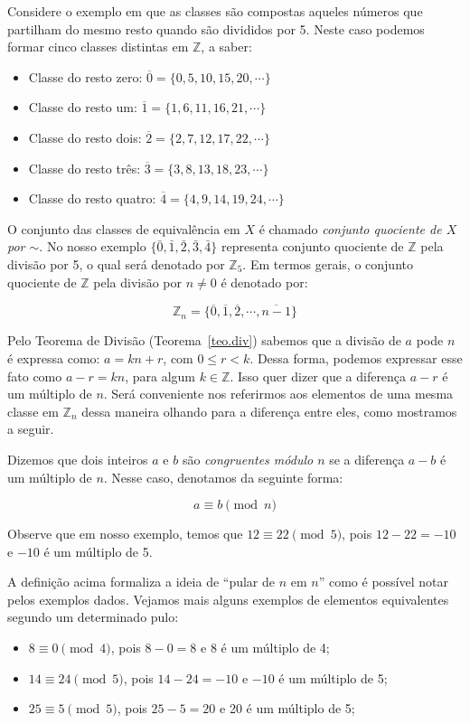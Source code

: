 	Considere o exemplo em que as classes s\~{a}o compostas aqueles n\'{u}meros que partilham do mesmo resto quando s\~{a}o divididos por 
	5. Neste caso podemos formar cinco classes distintas em $\mathbb{Z}$, a saber:
	\begin{itemize}
		\item Classe do resto zero: $\overline{0}=\{0, 5, 10, 15, 20, \cdots\}$
		\item Classe do resto um: $\overline{1}=\{1, 6, 11, 16, 21, \cdots\}$
		\item Classe do resto dois: $\overline{2}=\{2, 7, 12, 17, 22, \cdots\}$
		\item Classe do resto tr\^{e}s: $\overline{3}=\{3, 8, 13, 18, 23, \cdots\}$
		\item Classe do resto quatro: $\overline{4}=\{4, 9, 14, 19, 24, \cdots\}$
	\end{itemize}

	O conjunto das classes de equival\^{e}ncia em $X$ \'{e} chamado \textit{conjunto quociente de $X$ por $\sim$}.
	No nosso exemplo $\{\bar{0}, \bar{1}, \bar{2}, \bar{3}, \bar{4}\}$ representa conjunto quociente 
	de $\mathbb{Z}$ pela divis\~{a}o por 5, o qual ser\'{a} denotado por $\mathbb{Z}_{5}$. Em termos gerais, 
	o conjunto quociente de $\mathbb{Z}$ pela divis\~{a}o por $n\neq 0$ \'{e} denotado por:

	$$\mathbb{Z}_{n}=\{\overline{0}, \overline{1}, \overline{2}, \cdots, \overline{n-1}\}$$ 

Pelo Teorema de Divis\~{a}o (Teorema~\ref{teo.div}) sabemos que a divis\~{a}o de $a$ pode $n$ \'{e} expressa como:
$a=kn+r$, com $0\leq r< k$. Dessa forma, podemos expressar esse fato como $a-r=kn$, para algum $k\in\mathbb{Z}$. Isso 
quer dizer que a diferen\c{c}a $a-r$ \'{e} um m\'{u}ltiplo de $n$. Ser\'{a} conveniente nos referirmos aos elementos 
de uma mesma classe em $\mathbb{Z}_{n}$ dessa maneira olhando para a diferen\c{c}a entre eles, como mostramos a seguir. 
   
Dizemos que dois inteiros $a$ e $b$ s\~{a}o \textit{congruentes m\'{o}dulo $n$} se a diferen\c{c}a $a-b$ \'{e} um 
m\'{u}ltiplo de $n$. Nesse caso, denotamos da seguinte forma:

$$a \equiv b \pmod{n}$$ 

Observe que em nosso exemplo, temos que $12 \equiv 22 \pmod{5}$, pois $12-22=-10$ e $-10$ \'{e} um m\'{u}ltiplo de 5. 

A defini\c{c}\~{a}o acima formaliza a ideia de ``pular de $n$ em $n$'' como \'{e} poss\'{i}vel notar 
pelos exemplos dados. Vejamos mais alguns exemplos de elementos equivalentes segundo um determinado pulo:
\begin{itemize}
	\item $8 \equiv 0 \pmod{4}$, pois $8-0=8$ e 8 \'{e} um m\'{u}ltiplo de 4;
	\item $14 \equiv 24  \pmod{5}$, pois $14-24=-10$ e $-10$ \'{e} um m\'{u}ltiplo de 5;
	\item $25 \equiv 5 \pmod{5}$, pois $25-5=20$ e 20 \'{e} um m\'{u}ltiplo de 5;
\end{itemize}

